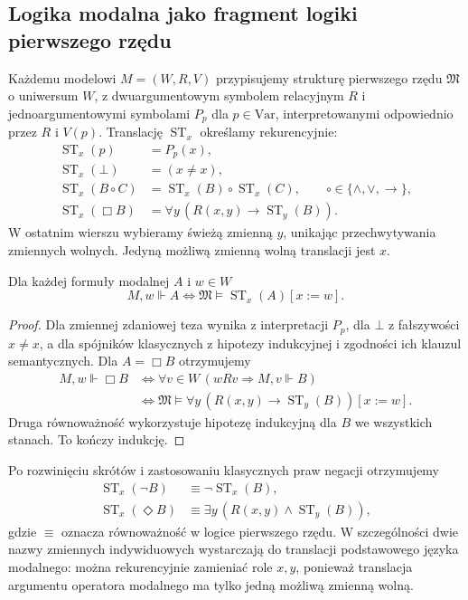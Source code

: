 \subsection{Logika modalna jako fragment logiki pierwszego rzędu}

\begin{definicja}
\label{def:ncl-kripke-standard-translation}
Każdemu modelowi $M=(W,R,V)$ przypisujemy
strukturę pierwszego rzędu $\mathfrak M$ o
uniwersum $W$, z dwuargumentowym symbolem
relacyjnym $R$ i jednoargumentowymi symbolami
$P_p$ dla $p\in\mathrm{Var}$, interpretowanymi
odpowiednio przez $R$ i $V(p)$.
Translację $\operatorname{ST}_x$ określamy
rekurencyjnie:
\[
\begin{aligned}
 \operatorname{ST}_x(p)&=P_p(x),\\
 \operatorname{ST}_x(\bot)&=(x\ne x),\\
 \operatorname{ST}_x(B\circ C)
 &=\operatorname{ST}_x(B)\circ\operatorname{ST}_x(C),
 \qquad\circ\in\{\wedge,\vee,\to\},\\
 \operatorname{ST}_x(\Box B)
 &=\forall y\,(R(x,y)\to\operatorname{ST}_y(B)).
\end{aligned}
\]
W ostatnim wierszu wybieramy świeżą zmienną $y$,
unikając przechwytywania zmiennych wolnych.
Jedyną możliwą zmienną wolną translacji jest $x$.
\end{definicja}

\begin{twierdzenie}
\label{thm:ncl-kripke-standard-translation}
Dla każdej formuły modalnej $A$ i $w\in W$
\[
 M,w\Vdash A\iff
 \mathfrak M\models\operatorname{ST}_x(A)[x:=w].
\]
\end{twierdzenie}
\begin{proof}
Dla zmiennej zdaniowej teza wynika
z interpretacji $P_p$, dla $\bot$ z fałszywości
$x\ne x$, a dla spójników klasycznych
z hipotezy indukcyjnej i zgodności ich
klauzul semantycznych.
Dla $A=\Box B$ otrzymujemy
\[
\begin{aligned}
 M,w\Vdash\Box B
 &\iff \forall v\in W\,(wRv\Rightarrow M,v\Vdash B)\\
 &\iff \mathfrak M\models
       \forall y\,(R(x,y)\to\operatorname{ST}_y(B))[x:=w].
\end{aligned}
\]
Druga równoważność wykorzystuje hipotezę
indukcyjną dla $B$ we wszystkich stanach.
To kończy indukcję.
\end{proof}
Po rozwinięciu skrótów i zastosowaniu
klasycznych praw negacji otrzymujemy
\[
\begin{aligned}
 \operatorname{ST}_x(\neg B)&\equiv
      \neg\operatorname{ST}_x(B),\\
 \operatorname{ST}_x(\Diamond B)&\equiv
      \exists y\,(R(x,y)\wedge\operatorname{ST}_y(B)),
\end{aligned}
\]
gdzie $\equiv$ oznacza równoważność w logice
pierwszego rzędu. W szczególności dwie nazwy
zmiennych indywiduowych wystarczają do
translacji podstawowego języka modalnego:
można rekurencyjnie zamieniać role $x,y$,
ponieważ translacja argumentu operatora
modalnego ma tylko jedną możliwą zmienną wolną.

